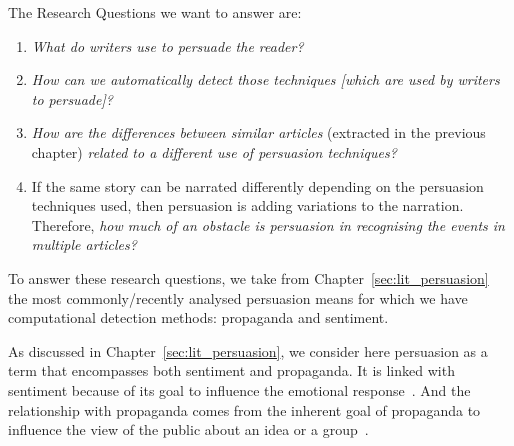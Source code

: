The Research Questions we want to answer are: 
\begin{enumerate}
    \item \emph{What do writers use to persuade the reader?}
    \item \emph{How can we automatically detect those techniques [which are used by writers to persuade]?} %
    \item \emph{How are the differences between similar articles} (extracted in the previous chapter) \emph{related to a different use of persuasion techniques?} %
    \item If the same story can be narrated differently depending on the persuasion techniques used, then persuasion is adding variations to the narration. Therefore, \emph{how much of an obstacle is persuasion in recognising the events in multiple articles?} %
\end{enumerate}



To answer these research questions, we take from Chapter~\ref{sec:lit_persuasion} the most commonly/recently analysed \gls{persuasion} means for which we have computational detection methods: \gls{propaganda} and \gls{sentiment}.

As discussed in Chapter~\ref{sec:lit_persuasion}, we consider here \gls{persuasion} as a term that encompasses both \gls{sentiment} and \gls{propaganda}. %
It is linked with sentiment because of its goal to influence the emotional response~\citep{gatti2014sentiment,rocklage2018persuasion,petty2015emotion,desteno2004discrete}.
And the relationship with propaganda comes from the inherent goal of propaganda to influence the view of the public about an idea or a group~\citep{bernays,jowett2018propaganda}.



